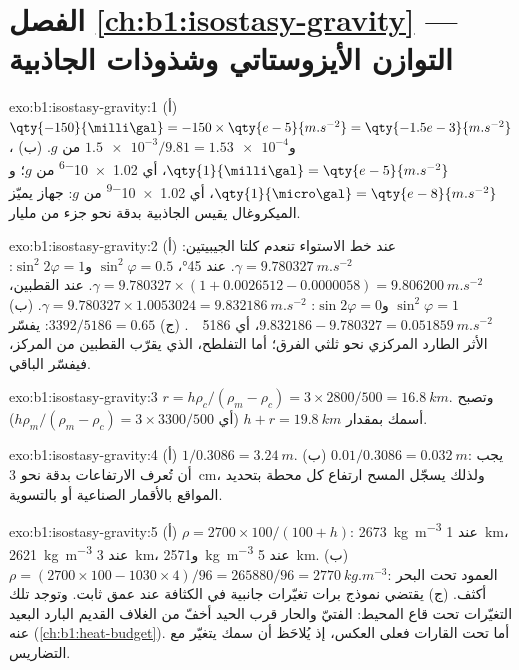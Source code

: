\section*{الفصل \ref{ch:b1:isostasy-gravity} --- التوازن الأيزوستاتي وشذوذات الجاذبية}

\begin{solution}{exo:b1:isostasy-gravity:1}
(أ) $\qty{-150}{\milli\gal} = -150\times\qty{e-5}{m.s^{-2}} = \qty{-1.5e-3}{m.s^{-2}}$،
و$\num{1.5e-3}/9.81 = \num{1.53e-4}$ من $g$. (ب) $\qty{1}{\milli\gal} =
\qty{e-5}{m.s^{-2}}$، أي \num{1.02e-6} من $g$؛ و$\qty{1}{\micro\gal} =
\qty{e-8}{m.s^{-2}}$، أي \num{1.02e-9} من $g$: جهاز يميّز الميكروغال يقيس الجاذبية بدقة نحو جزء من مليار.
\end{solution}

\begin{solution}{exo:b1:isostasy-gravity:2}
(أ) عند خط الاستواء تنعدم كلتا الجيبيتين: $\gamma = \qty{9.780327}{m.s^{-2}}$. عند
\ang{45}، $\sin^2\varphi = 0.5$ و$\sin^2 2\varphi = 1$:
$\gamma = 9.780327\times(1 + 0.0026512 - 0.0000058) = \qty{9.806200}{m.s^{-2}}$.
عند القطبين، $\sin^2\varphi = 1$ و$\sin 2\varphi = 0$:
$\gamma = 9.780327\times1.0053024 = \qty{9.832186}{m.s^{-2}}$.
(ب) $9.832186 - 9.780327 = \qty{0.051859}{m.s^{-2}}$، أي
\qty{5186}{\milli\gal}. (ج) $3392/5186 = 0.65$: يفسّر الأثر الطارد المركزي نحو ثلثي الفرق؛ أما التفلطح، الذي يقرّب القطبين من المركز، فيفسّر الباقي.
\end{solution}

\begin{solution}{exo:b1:isostasy-gravity:3}
$r = h\rho_c/(\rho_m - \rho_c) = 3\times2800/500 = \qty{16.8}{km}$. وتصبح  أسمك بمقدار $h + r = \qty{19.8}{km}$ (أي $h\rho_m/(\rho_m - \rho_c) =
3\times3300/500$).
\end{solution}

\begin{solution}{exo:b1:isostasy-gravity:4}
(أ) $1/0.3086 = \qty{3.24}{m}$. (ب) $0.01/0.3086 = \qty{0.032}{m}$: يجب أن تُعرف الارتفاعات بدقة نحو \qty{3}{cm}، ولذلك يسجّل المسح ارتفاع كل محطة بتحديد المواقع بالأقمار الصناعية أو بالتسوية.
\end{solution}

\begin{solution}{exo:b1:isostasy-gravity:5}
(أ) $\rho = 2700\times100/(100 + h)$: \qty{2673}{kg.m^{-3}} عند \qty{1}{km}،
\qty{2621}{kg.m^{-3}} عند \qty{3}{km}، و\qty{2571}{kg.m^{-3}} عند \qty{5}{km}.
(ب) $\rho = (2700\times100 - 1030\times4)/96 = \num{265880}/96 =
\qty{2770}{kg.m^{-3}}$: العمود تحت البحر أكثف. (ج) يقتضي نموذج برات تغيّرات جانبية في الكثافة عند عمق ثابت. وتوجد تلك التغيّرات تحت قاع المحيط:  الفتيّ والحار قرب الحيد أخفّ من الغلاف القديم البارد البعيد عنه (\cref{ch:b1:heat-budget}). أما تحت القارات فعلى العكس، إذ يُلاحَظ أن سمك  يتغيّر مع التضاريس.
\end{solution}


